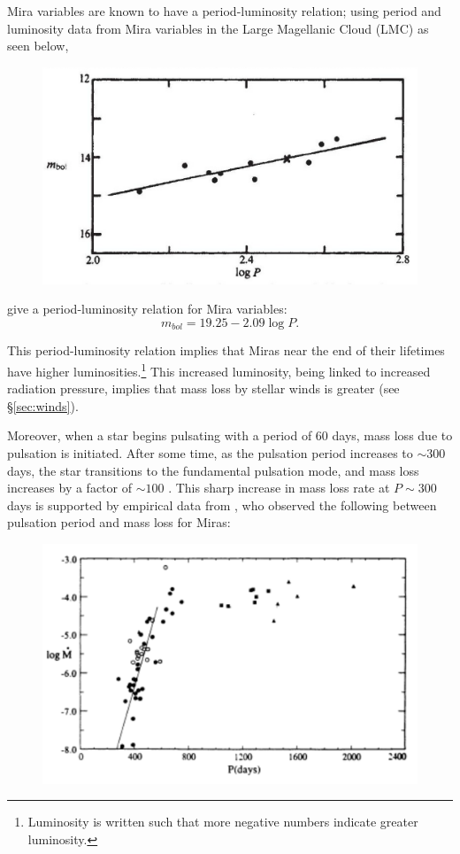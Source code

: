 \documentclass[twocolumn]{aastex63}
\begin{document}
Mira variables are known to have a period-luminosity relation; using period and luminosity data from Mira variables in the Large Magellanic Cloud (LMC) as seen below,

\begin{figure}[ht]
    \includegraphics[width=\textwidth]{period_luminosity.png}
\end{figure}

\cite{glass} give a period-luminosity relation for Mira variables: 
\begin{equation*}
    m_{bol} = 19.25 - 2.09\log P.
\end{equation*}

This period-luminosity relation implies that Miras near the end of their lifetimes have higher luminosities.\footnote{Luminosity is written such that more negative numbers indicate greater luminosity.} This increased luminosity, being linked to increased radiation pressure, implies that mass loss by stellar winds is greater (see \S \ref{sec:winds}). 

Moreover, when a star begins pulsating with a period of 60 days, mass loss due to pulsation is initiated. After some time, as the pulsation period increases to $\sim 300$ days, the star transitions to the fundamental pulsation mode, and mass loss increases by a factor of $\sim 100$ \citep{mcdonald, bedijn}. This sharp increase in mass loss rate at $P\sim 300$ days is supported by empirical data from \cite{vassiliadis}, who observed the following between pulsation period and mass loss for Miras:
\begin{figure}[ht]
    \includegraphics[width=\textwidth]{pulsation_massloss.png}
\end{figure}
\end{document}
